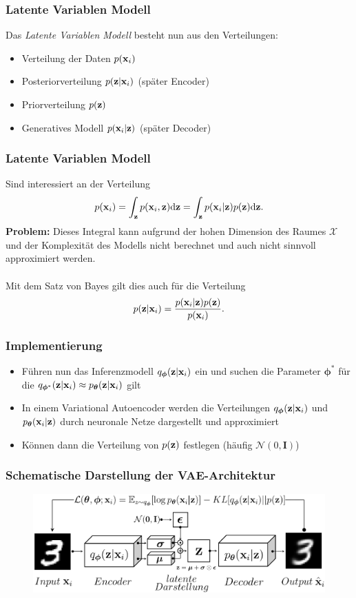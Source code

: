 \begin{frame}
	\frametitle{Latente Variablen Modell}
	Das \emph{Latente Variablen Modell} besteht nun aus den Verteilungen:
	\begin{itemize}
		\item Verteilung der Daten $p(\mathbf{x}_i)$
		\item Posteriorverteilung $p(\mathbf{z}|\mathbf{x}_i)$ \quad(später Encoder)
		\item Priorverteilung $p(\mathbf{z})$
		\item Generatives Modell $p(\mathbf{x}_i|\mathbf{z})$ \quad(später Decoder)
	\end{itemize}
\end{frame}

\begin{frame}
	\frametitle{Latente Variablen Modell}
	Sind interessiert an der Verteilung
	\[p(\mathbf{x}_i)= \int_{\mathbf{z}} p(\mathbf{x}_i,\mathbf{z}) \mathrm{d}\textbf{z} = \int_{\mathbf{z}} p(\mathbf{x}_i|\mathbf{z})p(\mathbf{z}) \mathrm{d}\mathbf{z}.\]
	\textbf{Problem:} Dieses Integral kann aufgrund der hohen Dimension des Raumes $\mathcal{X}$ und der Komplexität des Modells 
	nicht berechnet und auch nicht sinnvoll approximiert werden. \\ \ 
	\\
	Mit dem Satz von Bayes gilt dies auch für die Verteilung
	\[p(\mathbf{z}|\mathbf{x}_i)= \frac{p(\mathbf{x}_i|\mathbf{z})p(\mathbf{z})}{p(\mathbf{x}_i)}.\]
\end{frame}

\begin{frame}
	\frametitle{Implementierung}
		\begin{itemize}
		\item Führen nun das Inferenzmodell $q_{\boldsymbol\phi}(\mathbf{z}|\mathbf{x}_i)$ ein und suchen die Parameter $\boldsymbol\phi^{*}$ für die $q_{\boldsymbol\phi^{*}}(\mathbf{z}|\mathbf{x}_i) \approx p_{\boldsymbol\theta}(\mathbf{z}|\mathbf{x}_i)$ gilt 
		\item In einem Variational Autoencoder werden die Verteilungen $q_{\boldsymbol\phi}(\mathbf{z}|\mathbf{x}_i)$ und $p_{\boldsymbol\theta}(\mathbf{x}_i|\mathbf{z})$ durch neuronale Netze dargestellt und approximiert
		\item Können dann die Verteilung von $p(\mathbf{z})$ festlegen (häufig $\mathcal{N}(0,\textbf{I})$)
	\end{itemize}
\end{frame}

\begin{frame}
	\frametitle{Schematische Darstellung der VAE-Architektur}
	\begin{figure}[htbp!]
		\includegraphics[scale=0.27]{Bilder/VAE-Modell.PNG}
	\end{figure}
\end{frame}